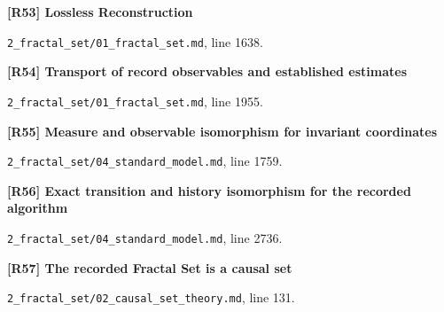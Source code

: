 \documentclass[11pt,a4paper]{article}
\begin{document}
\par\medskip\noindent\begin{minipage}{\linewidth}\textbf{[R53] Lossless Reconstruction}\label{src:thm-fractal-set-lossless}\par
{\small\texttt{}\par
\nolinkurl{2_fractal_set/01_fractal_set.md}, line 1638.\par}
\end{minipage}\par

\par\medskip\noindent\begin{minipage}{\linewidth}\textbf{[R54] Transport of record observables and established estimates}\label{src:prop-fractal-set-analytic-transfer}\par
{\small\texttt{}\par
\nolinkurl{2_fractal_set/01_fractal_set.md}, line 1955.\par}
\end{minipage}\par

\par\medskip\noindent\begin{minipage}{\linewidth}\textbf{[R55] Measure and observable isomorphism for invariant coordinates}\label{src:thm-sm-direct-measure-isomorphism}\par
{\small\texttt{}\par
\nolinkurl{2_fractal_set/04_standard_model.md}, line 1759.\par}
\end{minipage}\par

\par\medskip\noindent\begin{minipage}{\linewidth}\textbf{[R56] Exact transition and history isomorphism for the recorded algorithm}\label{src:thm-sm-instantiated-record-transition}\par
{\small\texttt{}\par
\nolinkurl{2_fractal_set/04_standard_model.md}, line 2736.\par}
\end{minipage}\par

\par\medskip\noindent\begin{minipage}{\linewidth}\textbf{[R57] The recorded Fractal Set is a causal set}\label{src:thm-fractal-is-causal-set}\par
{\small\texttt{}\par
\nolinkurl{2_fractal_set/02_causal_set_theory.md}, line 131.\par}
\end{minipage}\par
\end{document}

